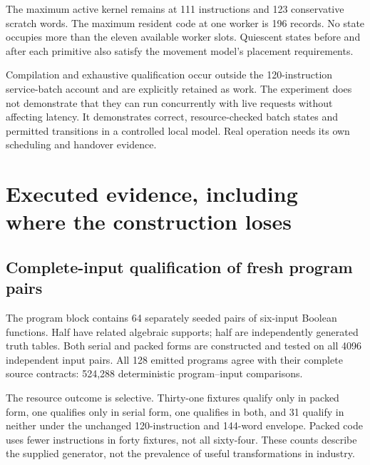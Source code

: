 \documentclass[11pt,letterpaper]{article}
\theoremstyle{definition}\newtheorem{definition}[theorem]{Definition}
\theoremstyle{remark}\newtheorem{remark}[theorem]{Remark}
\begin{document}
The maximum active kernel remains at 111 instructions and 123 conservative scratch words. The maximum resident code at one worker is 196 records. No state occupies more than the eleven available worker slots. Quiescent states before and after each primitive also satisfy the movement model's placement requirements.

Compilation and exhaustive qualification occur outside the 120-instruction service-batch account and are explicitly retained as work. The experiment does not demonstrate that they can run concurrently with live requests without affecting latency. It demonstrates correct, resource-checked batch states and permitted transitions in a controlled local model. Real operation needs its own scheduling and handover evidence.

\section{Executed evidence, including where the construction loses}
\label{sec:evidence}
\subsection{Complete-input qualification of fresh program pairs}
The program block contains 64 separately seeded pairs of six-input Boolean functions. Half have related algebraic supports; half are independently generated truth tables. Both serial and packed forms are constructed and tested on all 4096 independent input pairs. All 128 emitted programs agree with their complete source contracts: 524,288 deterministic program--input comparisons.

The resource outcome is selective. Thirty-one fixtures qualify only in packed form, one qualifies only in serial form, one qualifies in both, and 31 qualify in neither under the unchanged 120-instruction and 144-word envelope. Packed code uses fewer instructions in forty fixtures, not all sixty-four. These counts describe the supplied generator, not the prevalence of useful transformations in industry.
\end{document}
